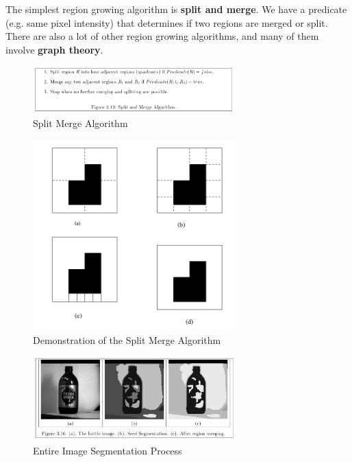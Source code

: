 \documentclass{article}
\begin{document}
The simplest region growing algorithm is \textbf{split and merge}. We have a predicate (e.g. same pixel intensity) that determines if two regions are merged or split. There are also a lot of other region growing algorithms, and many of them involve \textbf{graph theory}.

\begin{figure}[!htb]
    \begin{center}
        \includegraphics[width=0.7\textwidth]{L5F8.png}
        \vspace{-20pt}
    \end{center}
    \caption{Split Merge Algorithm}
\end{figure}

\begin{figure}[!htb]
    \begin{center}
        \includegraphics[width=0.7\textwidth]{L5F9.png}
        \vspace{-20pt}
    \end{center}
    \caption{Demonstration of the Split Merge Algorithm}
\end{figure}

\begin{figure}[!htb]
    \begin{center}
        \includegraphics[width=0.7\textwidth]{L5F10.png}
        \vspace{-20pt}
    \end{center}
    \caption{Entire Image Segmentation Process}
\end{figure}
\end{document}
